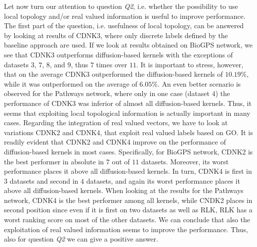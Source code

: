 \documentclass[review]{elsarticle}
\begin{document}
Let now turn our attention to question {\it Q2}, i.e. whether the possibility to use local topology and/or real valued information is useful to improve performance.
The first part of the question, i.e. usefulness of local topology, can be answered by looking at results of CDNK3, where only discrete labels defined by the baseline approach are used. If we look at results obtained on BioGPS network, we see that CDNK3 outperforms diffusion-based kernels with the 
 exceptions of datasets $3$, $7$, $8$, and $9$, thus $7$ times over $11$. It is important to stress, however, that on the average CDNK3 outperformed the diffusion-based kernels of $10.19\%$, while it was outperformed on the average of $6.05\%$. An even better scenario is observed for the Pathways network, where only in one case (dataset $4$) the performance of CDNK3 was inferior of almost all diffusion-based kernels.
Thus, it seems that exploiting local topological information is actually important in many cases. 
Regarding the integration of real valued vectors, we have to look at variations CDNK2 and CDNK4, that exploit real valued labels based on GO.
It is readily evident that CDNK2 and CDNK4 improve on the performance of diffusion-based kernels in most cases. Specifically, for BioGPS network,
CDNK2 is the best performer in absolute in $7$ out of $11$ datasets. Moreover, its worst performance places it above all diffusion-based kernels.
In turn, CDNK4 is first in $3$ datasets and second in $4$ datasets, and again its worst performance places it above all diffusion-based kernels.
When looking at the results for the Pathways network, CDNK4 is the best performer among all kernels, while CNDK2 places in second position since
even if it is first on two datasets as well as RLK, RLK has a worst ranking score on most of the other datasets.
We can conclude that also the exploitation of real valued information seems to improve the performance. Thus, also for question  {\it Q2} we can give a positive answer.
\end{document}
